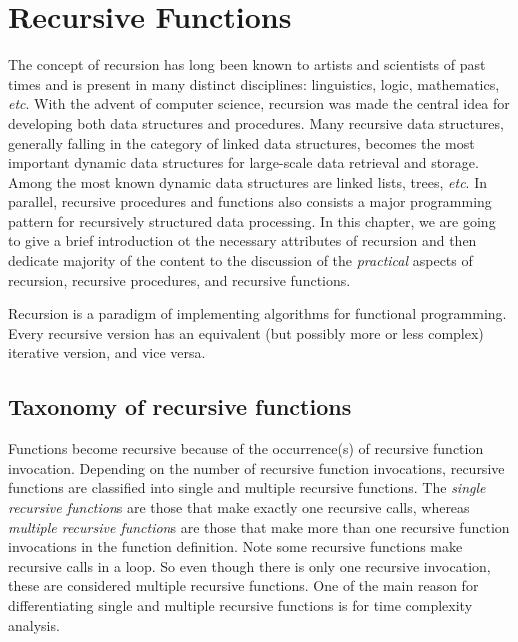 
\chapter{Recursive Functions} \label{ch:recursion}

The concept of recursion has long been known to artists and scientists of past times and is present
in many distinct disciplines: linguistics, logic, mathematics, \textit{etc}.
With the advent of computer science, recursion was made the central idea for developing
both data structures and procedures.
Many recursive data structures, generally falling in the category of linked data structures, becomes
the most important dynamic data structures for large-scale data retrieval and storage.
Among the most known dynamic data structures are linked lists, trees, \textit{etc}.
In parallel, recursive procedures and functions also consists a major programming pattern for
recursively structured data processing.
In this chapter, we are going to give a brief introduction ot the necessary attributes of
recursion and then dedicate majority of the content to the discussion of
the \emph{practical} aspects of recursion, recursive procedures, and recursive functions.

Recursion is a paradigm of implementing algorithms for functional programming.
Every recursive version has an equivalent (but possibly more or less complex) iterative version, and vice versa.

\section{Taxonomy of recursive functions}\label{sec:taxonomy-recursive-functions}

Functions become recursive because of the occurrence(s) of recursive function invocation.
Depending on the number of recursive function invocations, recursive functions are classified
into single and multiple recursive functions.
The \emph{single recursive function}s are those that make exactly one recursive calls, whereas
\emph{multiple recursive function}s are those that make more than one recursive function
invocations in the function definition.
Note some recursive functions make recursive calls in a loop.
So even though there is only one recursive invocation, these are considered multiple recursive
functions.
One of the main reason for differentiating single and multiple recursive functions
is for time complexity analysis.

